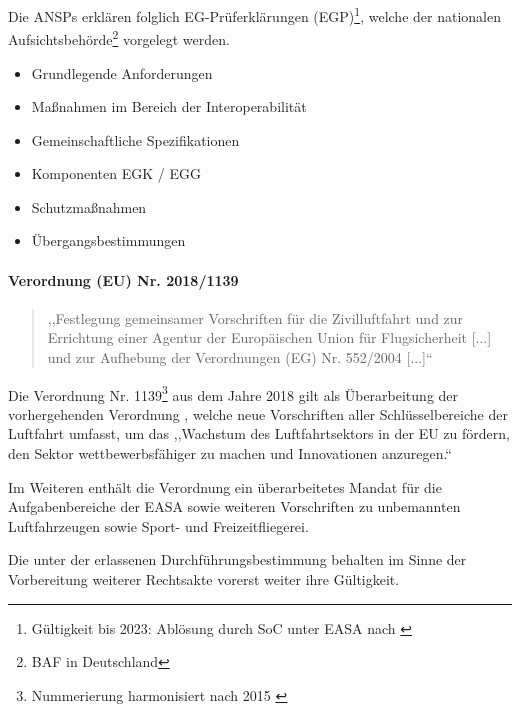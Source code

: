 Die \acp{ANSP} erklären folglich \acs{EG}-Prüferklärungen (\acs{EGP})\footnote{Gültigkeit bis 2023: Ablösung durch \ac{SoC} unter \acs{EASA} nach  \cite{2023R1769}}, welche der nationalen Aufsichtsbehörde\footnote{\acf{BAF} in Deutschland} vorgelegt werden. \cite[Art. 6 Abs. 1f]{2004R0552}

    \begin{itemize}
        \item Grundlegende Anforderungen
        \item Maßnahmen im Bereich der Interoperabilität
        \item Gemeinschaftliche Spezifikationen
        \item Komponenten \ac{EGK} / \ac{EGG}
        \item Schutzmaßnahmen
        \item Übergangsbestimmungen
    \end{itemize}

\paragraph{Verordnung (EU) Nr. 2018/1139}

\begin{quote}
    ,,Festlegung gemeinsamer Vorschriften für die Zivilluftfahrt und zur Errichtung einer Agentur der Europäischen Union für Flugsicherheit [...] und zur Aufhebung der Verordnungen (EG) Nr. 552/2004 [...]`` \cite{2018R1139} 
\end{quote}

Die Verordnung Nr. 1139\footnote{Nummerierung harmonisiert nach 2015 \cite{eu_number_harmony}} aus dem Jahre 2018 gilt als Überarbeitung der vorhergehenden Verordnung , welche neue Vorschriften aller Schlüsselbereiche der Luftfahrt umfasst, um das ,,Wachstum des Luftfahrtsektors in der \ac{EU} zu fördern, den Sektor wettbewerbsfähiger zu machen und Innovationen anzuregen.`` \cite{2018R1139_summary} 

Im Weiteren enthält die Verordnung ein überarbeitetes Mandat für die Aufgabenbereiche der \acf{EASA} sowie weiteren Vorschriften zu unbemannten Luftfahrzeugen sowie Sport- und Freizeitfliegerei.

Die unter der  erlassenen Durchführungsbestimmung behalten im Sinne der Vorbereitung weiterer Rechtsakte vorerst weiter ihre Gültigkeit. \cite[ErwG. 83]{2018R1139}

